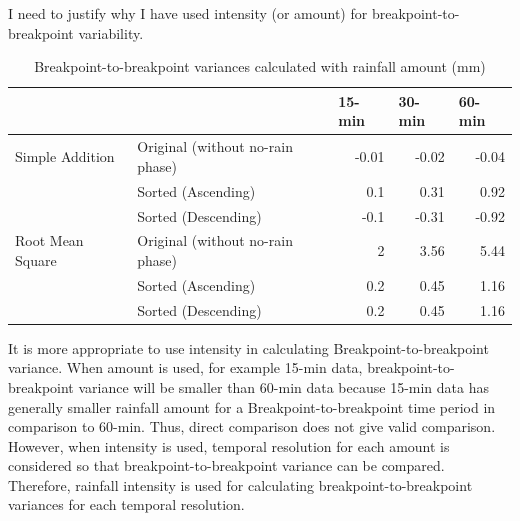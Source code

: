 I need to justify why I have used intensity (or amount) for
breakpoint-to-breakpoint variability.


\begin{table}[htbp]
  \centering
  \caption{Breakpoint-to-breakpoint variances calculated with rainfall amount
(mm)}
    \begin{tabular}{llrrr}
      \toprule
      &  & \multicolumn{1}{l}{15-min} & \multicolumn{1}{l}{30-min} &
\multicolumn{1}{l}{60-min} \\
      \midrule
      Simple Addition & Original (without no-rain phase)& -0.01 & -0.02 & -0.04
\\
      &Sorted (Ascending) & 0.1 & 0.31 & 0.92 \\
      &Sorted (Descending) & -0.1 & -0.31 & -0.92 \\
      \midrule
      Root Mean Square &Original (without no-rain phase)& 2 & 3.56 & 5.44 \\
      &Sorted (Ascending) & 0.2 & 0.45 & 1.16 \\
      &Sorted (Descending) & 0.2 & 0.45 & 1.16 \\
      \bottomrule
    \end{tabular}
  \label{b2b_amount}
\end{table}

It is more appropriate to use intensity in calculating Breakpoint-to-breakpoint
variance. When amount is used, for example 15-min data, breakpoint-to-breakpoint
variance will be smaller than 60-min data because 15-min data has generally
smaller rainfall amount for a Breakpoint-to-breakpoint time period in comparison
to 60-min. Thus, direct comparison does not give valid comparison. However, when
intensity is used, temporal resolution for each amount is considered so that
breakpoint-to-breakpoint variance can be compared. Therefore, rainfall intensity
is used for calculating breakpoint-to-breakpoint variances for each temporal
resolution.

